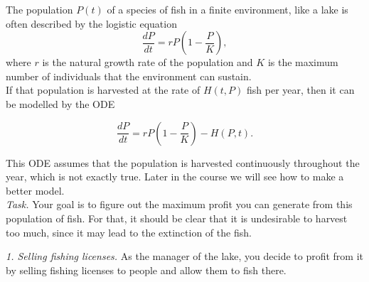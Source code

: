 The population $P(t)$ of a species of fish in a finite environment, like a lake is often described by the logistic equation
$$
\frac{dP}{dt} = r P \left(1 - \frac{P}{K} \right),
$$
where $r$ is the natural growth rate of the population and $K$ is the maximum number of individuals that the environment can sustain. \\

If that population is harvested at the rate of $H(t,P)$ fish per year, then it can be modelled by the ODE
\begin{emphbox}[]
$$
\frac{dP}{dt} = r P \left(1 - \frac{P}{K} \right) - H(P,t).
$$
\end{emphbox}


This ODE assumes that the population is harvested continuously throughout the year, which is not exactly true. Later in the course we will see how to make a better model. \\


\emph{Task.} Your goal is to figure out the maximum profit you can generate from this population of fish. For that, it should be clear that it is undesirable to harvest too much, since it may lead to the extinction of the fish.


\emph{1. Selling fishing licenses.}
As the manager of the lake, you decide to profit from it by selling fishing licenses to people and allow them to fish there. 

